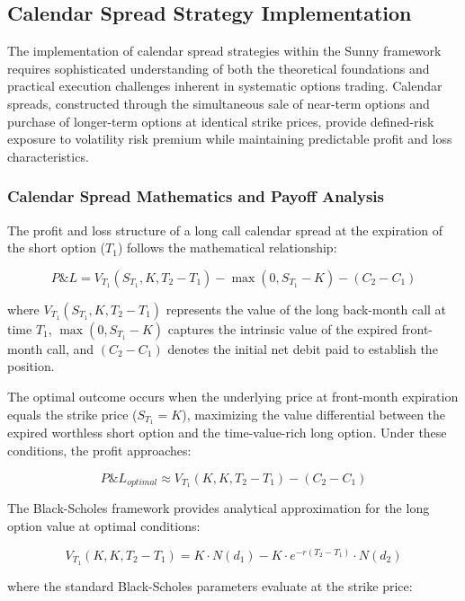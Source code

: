 \documentclass[
  american,
  11pt,
  11pt,
  letterpaper,
  onecolumn]{article}
\begin{document}
\subsection{Calendar Spread Strategy
Implementation}\label{calendar-spread-strategy-implementation}

The implementation of calendar spread strategies within the Sunny
framework requires sophisticated understanding of both the theoretical
foundations and practical execution challenges inherent in systematic
options trading. Calendar spreads, constructed through the simultaneous
sale of near-term options and purchase of longer-term options at
identical strike prices, provide defined-risk exposure to volatility
risk premium while maintaining predictable profit and loss
characteristics.

\subsubsection{Calendar Spread Mathematics and Payoff
Analysis}\label{calendar-spread-mathematics-and-payoff-analysis}

The profit and loss structure of a long call calendar spread at the
expiration of the short option (\(T_1\)) follows the mathematical
relationship:

\[P\&L = V_{T_1}(S_{T_1}, K, T_2 - T_1) - \max(0, S_{T_1} - K) - (C_2 - C_1)\]

where \(V_{T_1}(S_{T_1}, K, T_2 - T_1)\) represents the value of the
long back-month call at time \(T_1\), \(\max(0, S_{T_1} - K)\) captures
the intrinsic value of the expired front-month call, and \((C_2 - C_1)\)
denotes the initial net debit paid to establish the position.

The optimal outcome occurs when the underlying price at front-month
expiration equals the strike price (\(S_{T_1} = K\)), maximizing the
value differential between the expired worthless short option and the
time-value-rich long option. Under these conditions, the profit
approaches:

\[P\&L_{optimal} \approx V_{T_1}(K, K, T_2 - T_1) - (C_2 - C_1)\]

The Black-Scholes framework provides analytical approximation for the
long option value at optimal conditions:

\[V_{T_1}(K, K, T_2 - T_1) = K \cdot N(d_1) - K \cdot e^{-r(T_2-T_1)} \cdot N(d_2)\]

where the standard Black-Scholes parameters evaluate at the strike
price:
\end{document}
